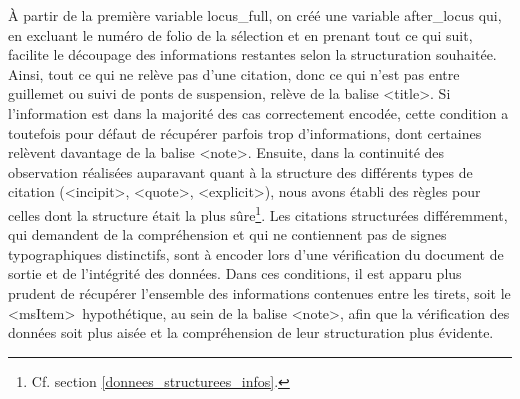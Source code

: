 \documentclass[a4paper,12pt,twoside]{book}
\begin{document}
À partir de la première variable \og locus\_full\fg{}, on créé une variable \og after\_locus\fg{} qui, en excluant le numéro de folio de la sélection et en prenant tout ce qui suit, facilite le découpage des informations restantes selon la structuration souhaitée. Ainsi, tout ce qui ne relève pas d'une citation, donc ce qui n'est pas entre guillemet ou suivi de ponts de suspension, relève de la balise \textless title\textgreater . Si l'information est dans la majorité des cas correctement encodée, cette condition a toutefois pour défaut de récupérer parfois trop d'informations, dont certaines relèvent davantage de la balise \textless note\textgreater . Ensuite, dans la continuité des observation réalisées auparavant quant à la structure des différents types de citation (\textless incipit\textgreater, \textless quote\textgreater, \textless explicit\textgreater ), nous avons établi des règles pour celles dont la structure était la plus sûre\footnote{Cf. section \ref{donnees_structurees_infos}.}. Les citations structurées différemment, qui demandent de la compréhension et qui ne contiennent pas de signes typographiques distinctifs, sont à encoder lors d'une vérification du document de sortie et de l'intégrité des données. Dans ces conditions, il est apparu plus prudent de récupérer l'ensemble des informations contenues entre les tirets, soit le \textless msItem\textgreater~hypothétique, au sein de la balise \textless note\textgreater, afin que la vérification des données soit plus aisée et la compréhension de leur structuration plus évidente. 
\end{document}
